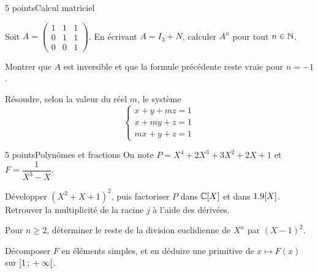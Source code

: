 \begin{exoEval}{5 points}{Calcul matriciel}
\begin{questions}
  \item Soit $A=\begin{pmatrix}1&1&1\\0&1&1\\0&0&1\end{pmatrix}$. En
    écrivant $A=I_3+N$, calculer $A^{n}$ pour tout $n\in\mathbb{N}$.
  \item Montrer que $A$ est inversible et que la formule précédente reste
    vraie pour $n=-1$.
  \item Résoudre, selon la valeur du réel $m$, le système
    \[
    \begin{cases}x+y+mz=1\\ x+my+z=1\\ mx+y+z=1\end{cases}
    \]
\end{questions}
\end{exoEval}

\begin{exoEval}{5 points}{Polynômes et fractions}
On note $P=X^{4}+2X^{3}+3X^{2}+2X+1$ et $F=\dfrac{1}{X^{3}-X}$.
\begin{questions}
  \item Développer $(X^{2}+X+1)^{2}$, puis factoriser $P$ dans $\mathbb{C}[X]$ et
    dans $1.9[X]$. Retrouver la multiplicité de la racine $j$ à l'aide des
    dérivées.
  \item Pour $n\geqslant2$, déterminer le reste de la division euclidienne
    de $X^{n}$ par $(X-1)^{2}$.
  \item Décomposer $F$ en éléments simples, et en déduire une primitive de
    $x\mapsto F(x)$ sur $\mathopen{]}1\,{;}\,+\infty\mathclose{[}$.
\end{questions}
\end{exoEval}
